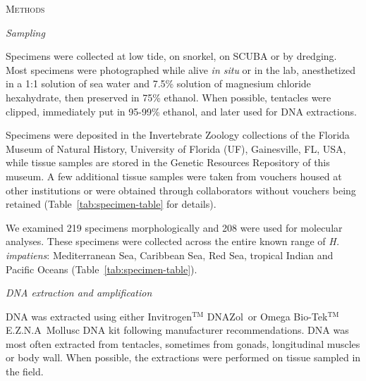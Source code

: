 \documentclass[12pt,letterpaper]{article}\usepackage[]{graphicx}\usepackage[]{color}
\renewcommand{\section}[1]{%
\bigskip
\begin{center}
\begin{Large}
\normalfont\scshape #1
\medskip
\end{Large}
\end{center}}
\renewcommand{\subsection}[1]{%
\bigskip
\begin{center}
\begin{large}
\normalfont\itshape #1
\end{large}
\end{center}}
\begin{document}

\section{Methods}

\subsection{Sampling}

Specimens were collected at low tide, on snorkel, on SCUBA or by dredging. Most
specimens were photographed while alive \textit{in situ} or in the lab,
anesthetized in a 1:1 solution of sea water and 7.5\% solution of magnesium
chloride hexahydrate, then preserved in 75\% ethanol. When possible, tentacles
were clipped, immediately put in 95-99\% ethanol, and later used for DNA
extractions.

Specimens were deposited in the Invertebrate Zoology collections of the Florida
Museum of Natural History, University of Florida (UF), Gainesville, FL, USA,
while tissue samples are stored in the Genetic Resources Repository of this
museum. A few additional tissue samples were taken from vouchers housed at other
institutions or were obtained through collaborators without vouchers being
retained (Table~\ref{tab:specimen-table} for details).

We examined 219 specimens morphologically and
208 were used for molecular analyses. These specimens were
collected across the entire known range of \textit{H. impatiens}: Mediterranean
Sea, Caribbean Sea, Red Sea, tropical Indian and Pacific Oceans
(Table~\ref{tab:specimen-table}).


\subsection{DNA extraction and amplification}



DNA was extracted using either Invitrogen$^{\text{TM}}$ DNAZol\textregistered\
or Omega Bio-Tek$^{\text{TM}}$ E.Z.N.A\textregistered\ Mollusc DNA kit following
manufacturer recommendations. DNA was most often extracted from tentacles,
sometimes from gonads, longitudinal muscles or body wall. When possible, the
extractions were performed on tissue sampled in the field.
\end{document}
